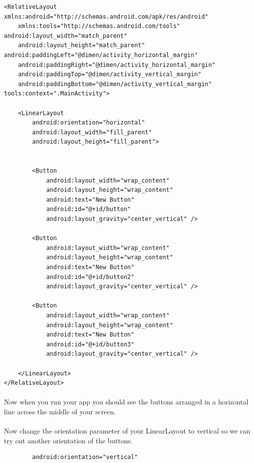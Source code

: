 \begin{lstlisting}
<RelativeLayout xmlns:android="http://schemas.android.com/apk/res/android"
    xmlns:tools="http://schemas.android.com/tools" android:layout_width="match_parent"
    android:layout_height="match_parent" android:paddingLeft="@dimen/activity_horizontal_margin"
    android:paddingRight="@dimen/activity_horizontal_margin"
    android:paddingTop="@dimen/activity_vertical_margin"
    android:paddingBottom="@dimen/activity_vertical_margin" tools:context=".MainActivity">

    <LinearLayout
        android:orientation="horizontal"
        android:layout_width="fill_parent"
        android:layout_height="fill_parent">


        <Button
            android:layout_width="wrap_content"
            android:layout_height="wrap_content"
            android:text="New Button"
            android:id="@+id/button"
            android:layout_gravity="center_vertical" />

        <Button
            android:layout_width="wrap_content"
            android:layout_height="wrap_content"
            android:text="New Button"
            android:id="@+id/button2"
            android:layout_gravity="center_vertical" />

        <Button
            android:layout_width="wrap_content"
            android:layout_height="wrap_content"
            android:text="New Button"
            android:id="@+id/button3"
            android:layout_gravity="center_vertical" />

    </LinearLayout>
</RelativeLayout>

\end{lstlisting}

\paragraph{} Now when you run your app you should see the buttons arranged in a horizontal line across the middle of your screen.

\paragraph{} Now change the orientation parameter of your LinearLayout to vertical so we can try out another orientation of the buttons. 

\begin{lstlisting}
        android:orientation="vertical"
\end{lstlisting}

